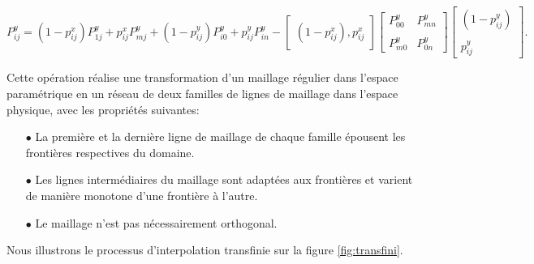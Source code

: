 $$
P_{ij}^y=(1-p_{ij}^x)P_{1j}^y+p_{ij}^xP_{mj}^y+(1-p_{ij}^y)P_{i0}^y+p_{ij}^y P_{in}^y-
\begin{bmatrix}
(1-p_{ij}^x), p_{ij}^x
\end{bmatrix}
\begin{bmatrix}
P_{00}^y&P_{mn}^y\\\\
P_{m0}^y&P_{0n}^y
\end{bmatrix}
\begin{bmatrix}
(1-p_{ij}^y)\\\\
p_{ij}^y
\end{bmatrix}.
$$

Cette opération réalise une transformation d'un maillage régulier dans l’espace paramétrique en un réseau de deux familles de lignes de maillage dans l’espace physique, avec les propriétés suivantes:\\
\begin{itemize}
 \item[$\bullet$]     La première et la dernière ligne de maillage de chaque famille épousent les frontières respectives du domaine.\\
 \item[$\bullet$] Les lignes intermédiaires du maillage sont adaptées aux frontières et varient de manière monotone d’une frontière à l’autre.\\
 \item[$\bullet$] Le maillage n’est pas nécessairement orthogonal.\\
\end{itemize}
Nous illustrons le processus d'interpolation transfinie sur la figure \ref{fig:transfini}.

